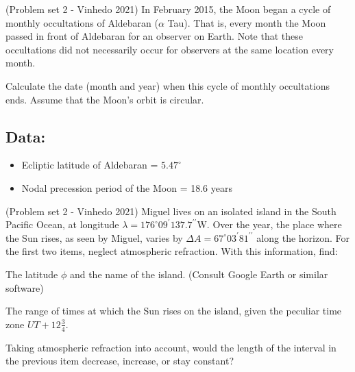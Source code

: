 \documentclass[11pt]{article}
\begin{document}
\begin{pproblem} (Problem set 2 - Vinhedo 2021)
    In February 2015, the Moon began a cycle of monthly occultations of Aldebaran ($\alpha$ Tau). That is, every month the Moon passed in front of Aldebaran for an observer on Earth. Note that these occultations did not necessarily occur for observers at the same location every month. 

    Calculate the date (month and year) when this cycle of monthly occultations ends. Assume that the Moon's orbit is circular.

    \subsection*{Data:}

    \begin{itemize}
        \item Ecliptic latitude of Aldebaran = $5.47^\circ$
        \item Nodal precession period of the Moon = 18.6 years
    \end{itemize}
\end{pproblem}


\begin{pproblem} (Problem set 2 - Vinhedo 2021)
    Miguel lives on an isolated island in the South Pacific Ocean, at longitude
    $\lambda = 176^{\circ}09^{\prime}137.7^{\prime\prime}\text{W}$. Over the year, the place where the Sun rises, as seen by Miguel, varies by $\Delta A = 67^{\circ}03^{\prime}81^{\prime\prime}$ along the horizon. For the first two items, neglect atmospheric refraction. With this information, find:

    \begin{alternativas}
        \item The latitude $\phi$ and the name of the island. (Consult Google Earth or similar software)
        \item The range of times at which the Sun rises on the island, given the peculiar time zone $UT + 12\frac{3}{4}$.
        \item Taking atmospheric refraction into account, would the length of the interval in the previous item decrease, increase, or stay constant?
    \end{alternativas}

\end{pproblem}
\end{document}
